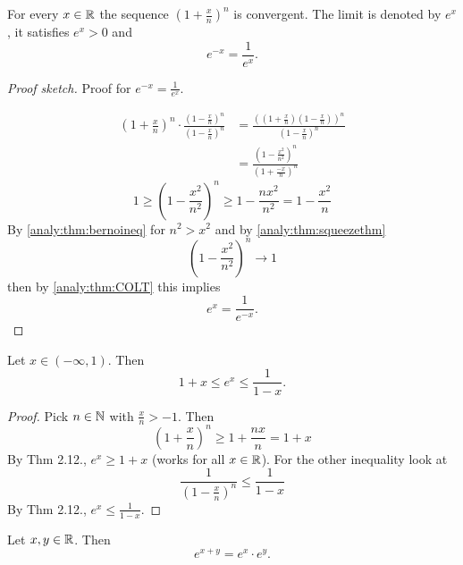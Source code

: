 \documentclass[10pt, a4paper]{article}
\begin{document}
\begin{theorem}
    For every $x \in \mathbb{R}$ the sequence $\left(1 + \frac{x}{n}\right) ^ n$ is convergent.
    The limit is denoted by $e ^ x$,
    it satisfies $e ^ x  > 0$ and
    \[
    e ^ {-x} = \frac{1}{e ^ x}.
    \]
    \begin{proof}[Proof sketch]\renewcommand{\qedsymbol}{$\triangle$}
        Proof for $e ^ {-x} = \frac{1}{e ^ x}$.

        \begin{align*}
            \left(1 + \frac{x}{n}\right) ^ n \cdot \frac{\left(1 - \frac{x}{n}\right) ^ n}{\left(1 - \frac{x}{n}\right) ^ n} &= \frac{\left(\left(1 + \frac{x}{n}\right)\left(1 - \frac{x}{n}\right)\right) ^ n}{\left(1 - \frac{x}{n}\right) ^ n} \\
            &= \frac{\left(1 - \frac{x ^ 2}{n ^ 2}\right) ^ n}{\left(1 + \frac{-x}{n}\right) ^ n}
        \end{align*}
        \[
        1 \geq \left(1 - \frac{x ^ 2}{n ^ 2}\right) ^ n \geq 1 - \frac{nx ^ 2}{n ^ 2} = 1 - \frac{x ^ 2}{n}
        \]
        By \autoref{analy:thm:bernoineq} for $n ^ 2 > x ^ 2$
        and by \autoref{analy:thm:squeezethm}
        \[
        \left(1 - \frac{x ^ 2}{n ^ 2}\right) ^ n \rightarrow 1
        \]
        then by \autoref{analy:thm:COLT} this implies
        \[
        e ^ x = \frac{1}{e ^ {-x}}.
        \]
    \end{proof}
\end{theorem}

\begin{lemma}\label{analy:lem:expboundlemma}
    Let $x \in (-\infty, 1)$.
    Then
    \[
    1 + x \leq e ^ x \leq \frac{1}{1 - x}.
    \]
    \begin{proof}
        Pick $n \in \mathbb{N}$ with $\frac{x}{n} > -1$.
        Then
        \[
        \left(1 + \frac{x}{n}\right) ^ n \geq 1 + \frac{nx}{n} = 1 + x
        \]
        By Thm 2.12.,
        $e ^ x \geq 1 + x$
        (works for all $x \in \mathbb{R}$).
        For the other inequality look at
        \[
        \frac{1}{\left(1 - \frac{x}{n}\right) ^ n} \leq \frac{1}{1 - x}
        \]
        By Thm 2.12.,
        $e ^ x \leq \frac{1}{1 - x}$.
    \end{proof}
\end{lemma}

\begin{theorem}
    Let $x, y \in \mathbb{R}$.
    Then
    \[
    e ^ {x + y} = e ^ x \cdot e ^ y.
    \]
\end{theorem}
\end{document}
